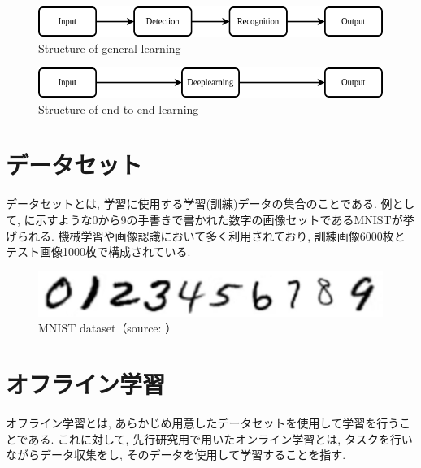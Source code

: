 \begin{figure}[h]
     \centering
     \includegraphics[keepaspectratio, scale=0.5]
     {images/example.png}
     \caption{Structure of general learning}
     \label{Fig:example}
     \end{figure}

\begin{figure}[h]
     \centering
     \includegraphics[keepaspectratio, scale=0.5]
     {images/end-to-end.png}
     \caption{Structure of end-to-end learning}
     \label{Fig:end-to-end}
     \end{figure}

\newpage
\section{データセット}
データセットとは, 学習に使用する学習(訓練)データの集合のことである. 例として, に示すような0から9の手書きで書かれた数字の画像セットであるMNISTが挙げられる. 機械学習や画像認識において多く利用されており, 訓練画像6000枚とテスト画像1000枚で構成されている. 

\vspace{5mm}

\begin{figure}[h]
     \centering
     \includegraphics[keepaspectratio, scale=0.5]
     {images/mnist.png}
     \caption{MNIST dataset（source: \cite{mnist}）}
     \label{Fig:mnist}
     \end{figure}

\section{オフライン学習}
オフライン学習とは, あらかじめ用意したデータセットを使用して学習を行うことである. これに対して, 先行研究用で用いたオンライン学習とは, タスクを行いながらデータ収集をし, そのデータを使用して学習することを指す. 

